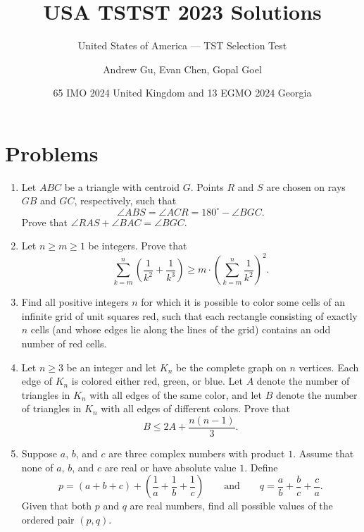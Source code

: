 \documentclass[11pt]{scrartcl}
\begin{document}
\title{USA TSTST 2023 Solutions}
\subtitle{United States of America --- TST Selection Test}
\author{Andrew Gu, Evan Chen, Gopal Goel}
\date{65 IMO 2024 United Kingdom and 13 EGMO 2024 Georgia}

\maketitle

\tableofcontents
\newpage

\addtocounter{section}{-1}
\section{Problems}
\begin{enumerate}[\bfseries 1.]
\item %
Let $ABC$ be a triangle with centroid $G$.
Points $R$ and $S$ are chosen on rays $GB$ and $GC$, respectively, such that
\[ \angle ABS = \angle ACR = 180^\circ - \angle BGC. \]
Prove that $\angle RAS + \angle BAC = \angle BGC$.

\item %
Let $n \ge m \ge 1$ be integers.
Prove that
\[ \sum_{k=m}^n \left( \frac{1}{k^2} + \frac{1}{k^3} \right)
  \ge m \cdot \left( \sum_{k=m}^n \frac{1}{k^2} \right)^2. \]

\item %
Find all positive integers $n$ for which it is possible to color some cells of
an infinite grid of unit squares red, such that each rectangle consisting of
exactly $n$ cells (and whose edges lie along the lines of the grid) contains
an odd number of red cells.

\item %
Let $n \ge 3$ be an integer and let $K_n$ be the complete graph on $n$ vertices.
Each edge of $K_n$ is colored either red, green, or blue.
Let $A$ denote the number of triangles in $K_n$
with all edges of the same color, and
let $B$ denote the number of triangles in $K_n$
with all edges of different colors.
Prove that
\[ B \le 2A + \frac{n(n-1)}3. \]

\item %
Suppose $a$, $b$, and $c$ are three complex numbers with product $1$.
Assume that none of $a$, $b$, and $c$ are real or have absolute value $1$.
Define
\[ p = (a+b+c) + \left( \frac1a+\frac1b+\frac1c \right)
  \qquad\text{and}\qquad
  q = \frac ab + \frac bc + \frac ca. \]
Given that both $p$ and $q$ are real numbers,
find all possible values of the ordered pair $(p,q)$.


\end{enumerate}
\end{document}
